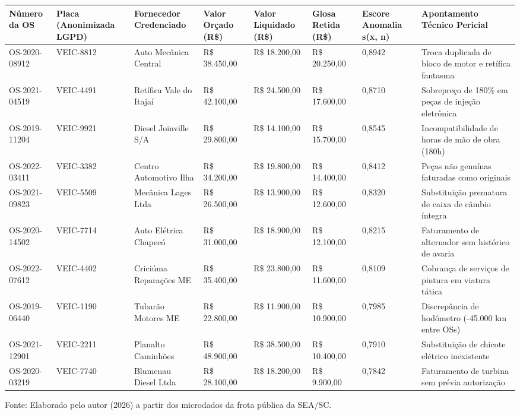 \documentclass[10pt,a4paper,journal]{article}
\begin{document}
\begin{table}[htbp]
\centering
\small
\begin{tabular}{llllllll}
\toprule
Número da OS & Placa (Anonimizada LGPD) & Fornecedor Credenciado & Valor Orçado (R\$) & Valor Liquidado (R\$) & Glosa Retida (R\$) & Escore Anomalia s(x, n) & Apontamento Técnico Pericial \\
\midrule
OS-2020-08912 & VEIC-8812 & Auto Mecânica Central & R\$ 38.450,00 & R\$ 18.200,00 & R\$ 20.250,00 & 0,8942 & Troca duplicada de bloco de motor e retífica fantasma \\
OS-2021-04519 & VEIC-4491 & Retífica Vale do Itajaí & R\$ 42.100,00 & R\$ 24.500,00 & R\$ 17.600,00 & 0,8710 & Sobrepreço de 180\% em peças de injeção eletrônica \\
OS-2019-11204 & VEIC-9921 & Diesel Joinville S/A & R\$ 29.800,00 & R\$ 14.100,00 & R\$ 15.700,00 & 0,8545 & Incompatibilidade de horas de mão de obra (180h) \\
OS-2022-03411 & VEIC-3382 & Centro Automotivo Ilha & R\$ 34.200,00 & R\$ 19.800,00 & R\$ 14.400,00 & 0,8412 & Peças não genuínas faturadas como originais \\
OS-2021-09823 & VEIC-5509 & Mecânica Lages Ltda & R\$ 26.500,00 & R\$ 13.900,00 & R\$ 12.600,00 & 0,8320 & Substituição prematura de caixa de câmbio íntegra \\
OS-2020-14502 & VEIC-7714 & Auto Elétrica Chapecó & R\$ 31.000,00 & R\$ 18.900,00 & R\$ 12.100,00 & 0,8215 & Faturamento de alternador sem histórico de avaria \\
OS-2022-07612 & VEIC-4402 & Criciúma Reparações ME & R\$ 35.400,00 & R\$ 23.800,00 & R\$ 11.600,00 & 0,8109 & Cobrança de serviços de pintura em viatura tática \\
OS-2019-06440 & VEIC-1190 & Tubarão Motores ME & R\$ 22.800,00 & R\$ 11.900,00 & R\$ 10.900,00 & 0,7985 & Discrepância de hodômetro (-45.000 km entre OSs) \\
OS-2021-12901 & VEIC-2211 & Planalto Caminhões & R\$ 48.900,00 & R\$ 38.500,00 & R\$ 10.400,00 & 0,7910 & Substituição de chicote elétrico inexistente \\
OS-2020-03219 & VEIC-7740 & Blumenau Diesel Ltda & R\$ 28.100,00 & R\$ 18.200,00 & R\$ 9.900,00 & 0,7842 & Faturamento de turbina sem prévia autorização \\
\bottomrule
\end{tabular}
\end{table}
Fonte: Elaborado pelo autor (2026) a partir dos microdados da frota pública da SEA/SC.
\end{document}
